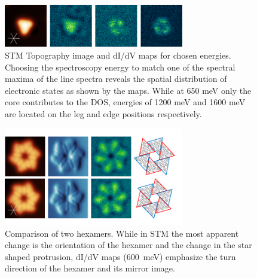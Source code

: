 \begin{figure}[] \centering
	\includegraphics[width=0.7\textwidth]{./images/hbbnc-maps}
	\caption{STM Topography image and dI/dV maps for chosen energies. Choosing the spectroscopy energy to match one of the spectral maxima of the line spectra reveals the spatial distribution of electronic states as shown by the maps. While at 650 meV only the core contributes to the DOS, energies of 1200 meV and 1600 meV are located on the leg and edge positions respectively.}
	\label{fig:HBBNC-Ag111-dIdV-maps}
\end{figure}

\begin{figure}[] \centering
	\includegraphics[width=0.7\textwidth]{./images/hbbnc-maps2}
	\caption{Comparison of two hexamers. While in STM the most apparent change is the orientation of the hexamer and the change in the star shaped protrusion, dI/dV maps (\SI{600}{\milli \eV}) emphasize the turn direction of the hexamer and its mirror image.}
	\label{}
\end{figure}


